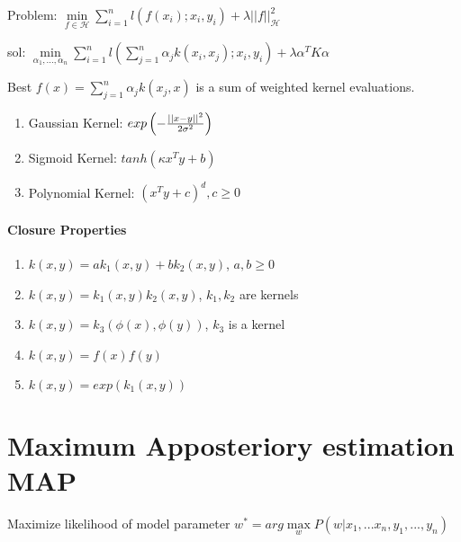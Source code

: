 \documentclass[11pt,twocolumn]{article}
\begin{document}
Problem: $\min \limits_{f \in \mathcal{H}} \sum \limits_{i=1}^n l(f(x_i);x_i, y_i) + \lambda || f||_{\mathcal{H}}^2$

sol: $\min \limits_{\alpha_1,...,\alpha_n} \sum \limits_{i=1}^n l \left( \sum \limits_{j=1}^n \alpha_j k(x_i, x_j);x_i,y_i  \right) + \lambda \alpha^T K \alpha$

Best $f(x) = \sum \limits_{j=1}^n \alpha_j k(x_j, x)$ is a sum of weighted kernel evaluations.

\begin{enumerate}

\item Gaussian Kernel: $exp\left( - {{||x-y||^2}\over{2 \sigma^2}} \right)$ 

\item Sigmoid Kernel: $tanh(\kappa x^T y + b)$

\item Polynomial Kernel: $\left( x^Ty + c \right)^d, c \geq 0$

\end{enumerate}

\paragraph{Closure Properties}

\begin{enumerate}
\item $k(x,y) = a k_1(x,y) + b k_2(x,y)$, $a,b \geq 0$
\item $k(x,y) =  k_1(x,y)  k_2(x,y)$, $k_1, k_2$ are kernels
\item $k(x,y) =  k_3(\phi(x),  \phi(y))$, $k_3$ is a kernel
\item $k(x,y) =  f(x) f(y)$
\item $k(x,y) =  exp(k_1(x,y))$
\end{enumerate}


\section{Maximum Apposteriory estimation MAP}
Maximize likelihood of model parameter $w^* = arg \max \limits_w P(w|x_1,...x_n,y_1,...,y_n) $ 
\end{document}
